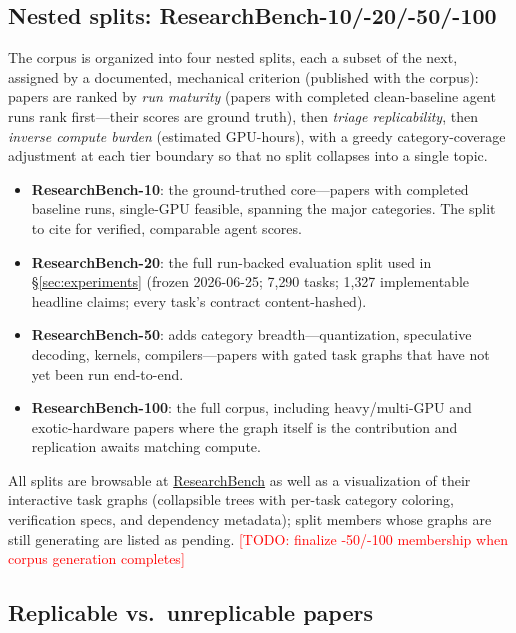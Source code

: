 \documentclass{article}
\newcommand{\todo}[1]{\textcolor{red}{[TODO: #1]}}
\begin{document}
\subsection{Nested splits: ResearchBench-10/-20/-50/-100}
\label{sec:splits}

The corpus is organized into four nested splits, each a subset of the next,
assigned by a documented, mechanical criterion (published with the corpus):
papers are ranked by \emph{run maturity} (papers with completed clean-baseline
agent runs rank first---their scores are ground truth), then \emph{triage
replicability}, then \emph{inverse compute burden} (estimated GPU-hours), with
a greedy category-coverage adjustment at each tier boundary so that no split
collapses into a single topic.

\begin{itemize}
  \item \textbf{ResearchBench-10}: the ground-truthed core---papers with
        completed baseline runs, single-GPU feasible, spanning the major
        categories. The split to cite for verified, comparable agent scores.
  \item \textbf{ResearchBench-20}: the full run-backed evaluation split used
        in \S\ref{sec:experiments} (frozen 2026-06-25; 7{,}290 tasks; 1{,}327
        implementable headline claims; every task's contract content-hashed).
  \item \textbf{ResearchBench-50}: adds category breadth---quantization,
        speculative decoding, kernels, compilers---papers with gated task
        graphs that have not yet been run end-to-end.
  \item \textbf{ResearchBench-100}: the full corpus, including
        heavy/multi-GPU and exotic-hardware papers where the graph itself is
        the contribution and replication awaits matching compute.
\end{itemize}

All splits are browsable at
\href{https://infinity-ai-institute.github.io/research-bench-rubrics/}{ResearchBench}
as well as a visualization of their interactive task graphs (collapsible trees
with per-task category coloring, verification specs, and dependency
metadata); split members whose graphs are still generating are listed as
pending. \todo{finalize -50/-100 membership when corpus generation completes}

\subsection{Replicable vs.\ unreplicable papers}
\end{document}
